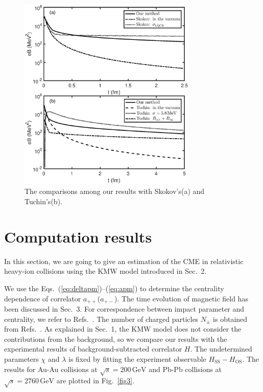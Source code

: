 \documentclass[preprint]{elsarticle}
\begin{document}
\begin{figure}
\centering
\includegraphics[width=8.5cm]{fig2.eps}
\caption{\label{fig2}The comparisons among our results with Skokov's(a) and Tuchin's(b).}
\end{figure}

\section{Computation results}\label{compuResult}
In this section, we are going to give an estimation of the CME in relativistic heavy-ion collisions using the KMW model introduced in Sec.~2.

We use the Eqs.~(\ref{eq:deltapm})--(\ref{eq:apm}) to determine the centrality dependence of correlator $a_{++}$($a_{+-}$). The time evolution of magnetic field has been discussed in Sec.~3. For correspondence between impact parameter and centrality, we refer to Refs.~\cite{Ray:2007av,Abelev:2013qoq}.
The number of charged particles $N_\pm$ is obtained from Refs.~\cite{Ray:2007av,Aamodt:2011cdo}. As explained in Sec.~1, the KMW model does not consider the contributions from the background, so we compare our results with the experimental results of background-subtracted correlator $H$. The undetermined parameters $\chi$ and $\lambda$ is fixed by fitting the experiment observable $H_\text{SS} - H_\text{OS}$. The results for Au-Au collisions at $\sqrt{s} = 200\,\mathrm{GeV}$ and Pb-Pb collisions at $\sqrt{s} = 2760\,\mathrm{GeV}$ are plotted in Fig.~\ref{fig3}.
\end{document}
